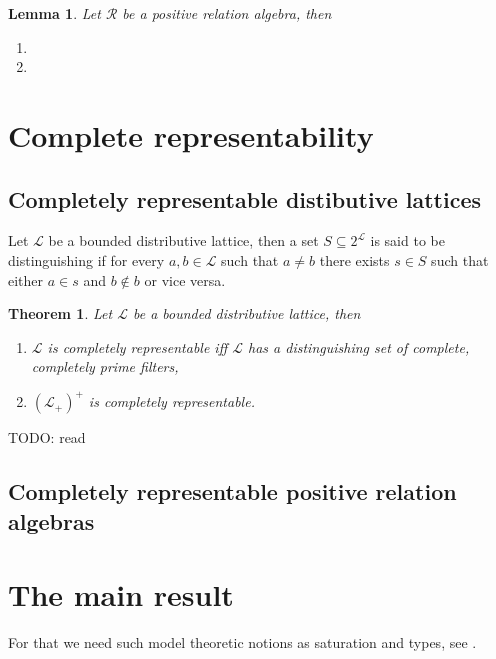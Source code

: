 \documentclass[a4paper]{article}
\theoremstyle{defin}
\theoremstyle{theorem}
\newtheorem{theorem}{Theorem}
\theoremstyle{claim}
\theoremstyle{prop}
\theoremstyle{lemma}
\newtheorem{lemma}{Lemma}
\theoremstyle{fact}
\theoremstyle{ex}
\theoremstyle{col}
\begin{document}
\begin{lemma} Let $\mathcal{R}$ be a positive relation algebra, then

\begin{enumerate}
\item
\item 
\end{enumerate}
\end{lemma}

\section{Complete representability}

\subsection{Completely representable distibutive lattices}

Let $\mathcal{L}$ be a bounded distributive lattice, then a set $S \subseteq 2^{\mathcal{L}}$ is said to be distinguishing if for every $a, b \in \mathcal{L}$ such that $a \neq b$ there exists $s \in S$ such that either $a \in s$ and $b \notin b$ or vice versa.

\begin{theorem} Let $\mathcal{L}$ be a bounded distributive lattice, then

\begin{enumerate}
\item $\mathcal{L}$ is completely representable iff $\mathcal{L}$ has a distinguishing set of complete, completely prime filters,
\item $(\mathcal{L}_+)^{+}$ is completely representable.
\end{enumerate}

\end{theorem}

TODO: read \cite{egrot2012completely}

\subsection{Completely representable positive relation algebras}

\section{The main result}

For that we need such model theoretic notions as saturation and types, see \cite[Section 6.3]{hodges1993model}.
\end{document}
